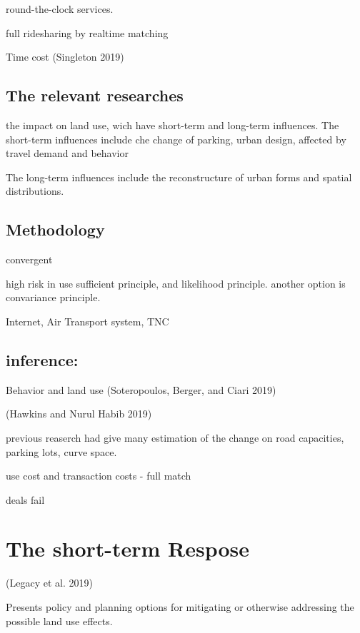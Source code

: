 \documentclass[12pt,]{article}
\begin{document}
round-the-clock services.

full ridesharing by realtime matching

Time cost (Singleton 2019)

\hypertarget{the-relevant-researches}{%
\subsection{The relevant researches}\label{the-relevant-researches}}

the impact on land use, wich have short-term and long-term influences.
The short-term influences include che change of parking, urban design,
affected by travel demand and behavior

The long-term influences include the reconstructure of urban forms and
spatial distributions.

\hypertarget{methodology}{%
\subsection{Methodology}\label{methodology}}

convergent

high risk in use sufficient principle, and likelihood principle. another
option is convariance principle.

Internet, Air Transport system, TNC

\hypertarget{inference}{%
\subsection{inference:}\label{inference}}

Behavior and land use (Soteropoulos, Berger, and Ciari 2019)

(Hawkins and Nurul Habib 2019)

previous reaserch had give many estimation of the change on road
capacities, parking lots, curve space.

use cost and transaction costs - full match

deals fail

\hypertarget{the-short-term-respose}{%
\section{The short-term Respose}\label{the-short-term-respose}}

(Legacy et al. 2019)

Presents policy and planning options for mitigating or otherwise
addressing the possible land use effects.
\end{document}
